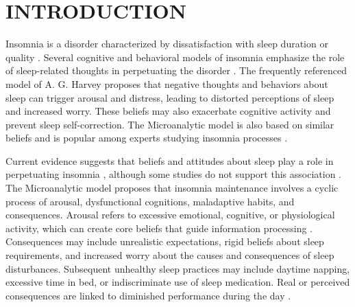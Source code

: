 \documentclass[
  12pt,
  twoside,
  openright,
  a4paper,
  chapter=TITLE,
  section=TITLE,
  brazil]{abntex2}
\renewcommand*\contentsname{Table of contents}
\newcommand\contentsname{Table of contents}
\begin{document}
\pdfbookmark[0]{\contentsname}{toc}
\tableofcontents*

\textual
\pagestyle{simple}

\ifdefined\Shaded\renewenvironment{Shaded}{\begin{tcolorbox}[interior hidden, borderline west={3pt}{0pt}{shadecolor}, sharp corners, boxrule=0pt, breakable, enhanced, frame hidden]}{\end{tcolorbox}}\fi

\hypertarget{introduction}{%
\section{INTRODUCTION}\label{introduction}}

Insomnia is a disorder characterized by dissatisfaction with sleep
duration or quality \autocite{americanpsychiatricassociation2013}.
Several cognitive and behavioral models of insomnia emphasize the role
of sleep-related thoughts in perpetuating the disorder
\autocite{espie2006,harvey2002,lundh2005,morin1993,ong2012,perlis1997}.
The frequently referenced model of A. G. Harvey \autocite*{harvey2002}
proposes that negative thoughts and behaviors about sleep can trigger
arousal and distress, leading to distorted perceptions of sleep and
increased worry. These beliefs may also exacerbate cognitive activity
and prevent sleep self-correction. The Microanalytic model
\autocite{morin1993} is also based on similar beliefs and is popular
among experts studying insomnia processes \autocite{marques2015}.

Current evidence suggests that beliefs and attitudes about sleep play a
role in perpetuating insomnia
\autocite{akram2020,chow2018,harvey2017,lancee2019}, although some
studies do not support this association \autocite{norell-clarke2021}.
The Microanalytic model \autocite{morin1993} proposes that insomnia
maintenance involves a cyclic process of arousal, dysfunctional
cognitions, maladaptive habits, and consequences. Arousal refers to
excessive emotional, cognitive, or physiological activity, which can
create core beliefs that guide information processing
\autocite{marques2015}. Consequences may include unrealistic
expectations, rigid beliefs about sleep requirements, and increased
worry about the causes and consequences of sleep disturbances.
Subsequent unhealthy sleep practices may include daytime napping,
excessive time in bed, or indiscriminate use of sleep medication. Real
or perceived consequences are linked to diminished performance during
the day \autocite{sullivan2022}.
\end{document}
